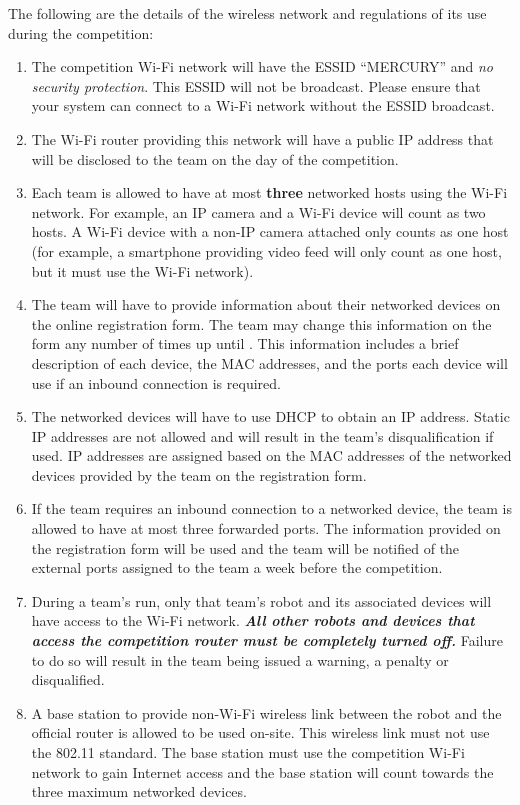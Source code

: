 The following are the details of the wireless network and regulations of its use during the competition:

\begin{enumerate}
\item The competition Wi-Fi network will have the ESSID “MERCURY” and \textit{no security protection}. This ESSID will not be broadcast. Please ensure that your system can connect to a Wi-Fi network without the ESSID broadcast.
\item The Wi-Fi router providing this network will have a public IP address that will be disclosed to the team on the day of the competition.
\item Each team is allowed to have at most \textbf{three} networked hosts using the Wi-Fi network. For example, an IP camera and a Wi-Fi device will count as two hosts. A Wi-Fi device with a non-IP camera attached only counts as one host (for example, a smartphone providing video feed will only count as one host, but it must use the Wi-Fi network).
\item The team will have to provide information about their networked devices on the online registration form. The team may change this information on the form any number of times up until \textbf{\network}. This information includes a brief description of each device, the MAC addresses, and the ports each device will use if an inbound connection is required.
\item The networked devices will have to use DHCP to obtain an IP address. Static IP addresses are not allowed and will result in the team's disqualification if used. IP addresses are assigned based on the MAC addresses of the networked devices provided by the team on the registration form.
\item If the team requires an inbound connection to a networked device, the team is allowed to have at most three forwarded ports. The information provided on the registration form will be used and the team will be notified of the external ports assigned to the team a week before the competition.
\item During a team's run, only that team's robot and its associated devices will have access to the Wi-Fi network. \textbf{\textit{All other robots and devices that access the competition router must be completely turned off.}} Failure to do so will result in the team being issued a warning, a penalty or disqualified.
\item A base station to provide non-Wi-Fi wireless link between the robot and the official router is allowed to be used on-site. This wireless link must not use the 802.11 standard. The base station must use the competition Wi-Fi network to gain Internet access and the base station will count towards the three maximum networked devices.

\end{enumerate}
